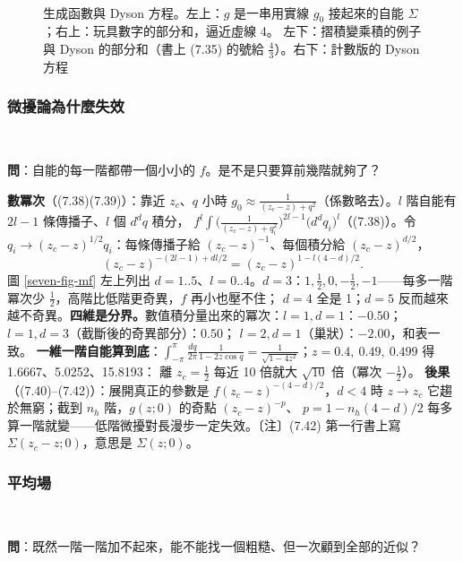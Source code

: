 \begin{figure}[htbp]
\centering
\SevenFigDyson\hfill\SevenFigDysonBars\\[2pt]
{\footnotesize\setlength{\tabcolsep}{4pt}\SevenTabDyson}
\caption{生成函數與 Dyson 方程。左上：$g$ 是一串用實線 $g_0$ 接起來的自能 $\Sigma$；右上：玩具數字的部分和，逼近虛線 4。
左下：摺積變乘積的例子與 Dyson 的部分和（書上 (7.35) 的號給 $\frac43$）。右下：計數版的 Dyson 方程}\label{seven-fig-dyson}
\end{figure}

\subsubsection{微擾論為什麼失效}
\leavevmode{}\ \par\nopagebreak

\textbf{問}：自能的每一階都帶一個小小的 $f$。是不是只要算前幾階就夠了？

\textbf{數冪次}（(7.38)(7.39)）：靠近 $z_c$、$q$ 小時 $g_0\approx\frac{1}{(z_c-z)+q^2}$（係數略去）。$l$ 階自能有 $2l-1$ 條傳播子、$l$ 個 $d^dq$ 積分，
$f^l\int\big(\frac1{(z_c-z)+q_i^2}\big)^{2l-1}\big(d^dq_i\big)^l$（(7.38)）。令 $q_i\to(z_c-z)^{1/2}q_i$：每條傳播子給 $(z_c-z)^{-1}$、每個積分給 $(z_c-z)^{d/2}$，
\[(z_c-z)^{-(2l-1)+dl/2}=(z_c-z)^{1-l(4-d)/2}.\tag{7.39}\]
圖 \ref{seven-fig-mf} 左上列出 $d=1..5$、$l=0..4$。$d=3$：$1,\frac12,0,-\frac12,-1$——每多一階冪次少 $\frac12$，高階比低階更奇異，$f$ 再小也壓不住；
$d=4$ 全是 1；$d=5$ 反而越來越不奇異。\textbf{四維是分界。}數值積分量出來的冪次：$l=1,d=1$：$-0.50$；$l=1,d=3$（截斷後的奇異部分）：$0.50$；
$l=2,d=1$（巢狀）：$-2.00$，和表一致。
\textbf{一維一階自能算到底}：$\int_{-\pi}^{\pi}\frac{dq}{2\pi}\frac1{1-2z\cos q}=\frac1{\sqrt{1-4z^2}}$；$z=0.4,\ 0.49,\ 0.499$ 得 1.6667、5.0252、15.8193：
離 $z_c=\frac12$ 每近 10 倍就大 $\sqrt{10}$ 倍（冪次 $-\frac12$）。
\textbf{後果}（(7.40)--(7.42)）：展開真正的參數是 $f(z_c-z)^{-(4-d)/2}$，$d<4$ 時 $z\to z_c$ 它趨於無窮；截到 $n_h$ 階，$g(z;0)$ 的奇點 $(z_c-z)^{-p}$、
$p=1-n_h(4-d)/2$ 每多算一階就變——低階微擾對長漫步一定失效。〔注〕(7.42) 第一行書上寫 $\Sigma(z_c-z;0)$，意思是 $\Sigma(z;0)$。

\subsubsection{平均場}
\leavevmode{}\ \par\nopagebreak

\textbf{問}：既然一階一階加不起來，能不能找一個粗糙、但一次顧到全部的近似？

